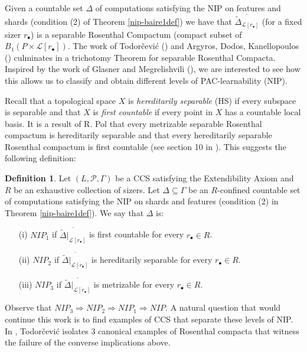 \documentclass[psamsfonts]{amsart}
\theoremstyle{definition}
\newtheorem{defn}[thm]{Definition}
\theoremstyle{remark}
\numberwithin{equation}{section}
\begin{document}
Given a countable set $\Delta$ of computations satisfying the NIP on features and shards (condition (2) of Theorem \ref{nip-baire1def}) we have that $\overline{\tilde\Delta_{\mathcal{L}[r_\bullet]}}$ (for a fixed sizer $r_\bullet$) is a separable Rosenthal Compactum (compact subset of $B_1(P\times\mathcal{L}[r_\bullet])$. The work of Todorčević (\cite{Todorcevic_1999_CompactSubsetsBaire}) and Argyros, Dodos, Kanellopoulos (\cite{argyros2008rosenthal}) culminates in a trichotomy Theorem for separable Rosenthal Compacta. Inspired by the work of Glasner and Megrelishvili (\cite{glasner2022tame}), we are interested to see how this allows us to classify and obtain different levels of PAC-learnability (NIP).

Recall that a topological space $X$ is \emph{hereditarily separable} (HS) if every subspace is separable and that $X$ is \emph{first countable} if every point in $X$ has a countable local basis. It is a result of R. Pol that every metrizable separable Rosenthal compactum is hereditarily separable and that every hereditarily separable Rosenthal compactum is first countable (see section 10 in \cite{debs2013rosenthal}). This suggests the following definition:

\begin{defn}
    Let $(L,\mathcal{P},\Gamma)$ be a CCS satisfying the Extendibility Axiom and $R$ be an exhaustive collection of sizers. Let $\Delta\subseteq\Gamma$ be an $R$-confined countable set of computations satisfying the NIP on shards and features (condition (2) in Theorem \ref{nip-baire1def}). We say that $\Delta$ is:
    \begin{itemize}
        \item [(i)] $NIP_1$ if $\overline{\tilde\Delta|_{\mathcal{L}[r_\bullet]}}$ is first countable for every $r_\bullet\in R$.
        \item [(ii)] $NIP_2$ if $\overline{\tilde\Delta|_{\mathcal{L}[r_\bullet]}}$ is hereditarily separable for every $r_\bullet\in R$.
        \item [(iii)] $NIP_3$ if $\overline{\tilde\Delta|_{\mathcal{L}[r_\bullet]}}$ is metrizable for every $r_\bullet\in R$.
    \end{itemize}
\end{defn}

Observe that $NIP_3 \Rightarrow NIP_2\Rightarrow NIP_1\Rightarrow NIP$. A natural question that would continue this work is to find examples of CCS that separate these levels of NIP. In \cite{Todorcevic_1999_CompactSubsetsBaire}, Todorčević isolates 3 canonical examples of Rosenthal compacta that witness the failure of the converse implications above.
\end{document}
